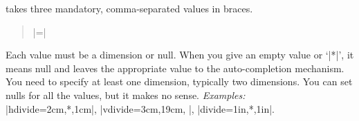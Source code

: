 \begin{enumerate}
   takes three mandatory, comma-separated values in braces.
   \begin{quote}
   |=|
   \end{quote}
   Each value must be a dimension or null. When you give an empty value
   or `|*|', it means null and leaves the appropriate value 
   to the auto-completion mechanism. You need to specify at least one
   dimension, typically two dimensions. You can set nulls for all the 
   values, but it makes no sense.
   \textit{Examples:}\\
   \hspace*{2em} |hdivide={2cm,*,1cm}|, |vdivide={3cm,19cm, }|,
                  |divide={1in,*,1in}|.
\end{enumerate}
